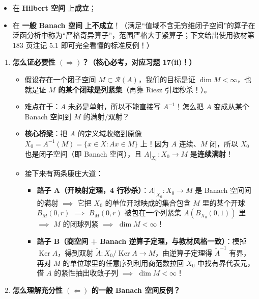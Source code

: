 \documentclass[11pt,a4paper]{article}
\providecommand{\tightlist}{\setlength{\itemsep}{2pt}\setlength{\parskip}{0pt}}
\newcommand{\SubPillAmber}[1]{%
  \Needspace{4.5\baselineskip}\vspace{5.5pt}\noindent
  \tcbox[on line, colback=AmberSoft, colframe=AmberMain!45!BorderColor, boxrule=0.45pt,
    arc=3.5pt, left=6pt, right=6pt, top=2pt, bottom=2pt]{\small\bfseries\color{AmberMain}#1}%
  \par\vspace{3pt}%
}
\renewenvironment{quote}{%
  \begin{tcolorbox}[
    enhanced,
    breakable,
    colback=AccentSoft!48!white,
    colframe=AccentMain,
    boxrule=0pt,
    leftrule=2.8pt,
    arc=2.5pt,
    left=9pt, right=8pt, top=6pt, bottom=6pt,
    before skip=5.5pt, after skip=5.5pt
  ]\small
}{%
  \end{tcolorbox}%
}
\begin{document}
\begin{quote}
\begin{enumerate}
\begin{itemize}
    \begin{itemize}
    \tightlist
    \item
      在 \textbf{Hilbert 空间} 上\textbf{成立}；
    \item
      在 \textbf{一般 Banach 空间} 上\textbf{不成立}！（满足``值域不含无穷维闭子空间''的算子在泛函分析中称为``严格奇异算子''，范围严格大于紧算子；下文给出使用教材第 183 页注记 5.1 即可完全看懂的标准反例！）
    \end{itemize}
  \end{itemize}
\end{enumerate}
\end{quote}

\SubPillAmber{【零基础破题思路】}

\begin{enumerate}
\def\labelenumi{\arabic{enumi}.}
\tightlist
\item
  \textbf{怎么证必要性 \((\Rightarrow)\)？（核心必考，对应习题 17(ii)！）}

  \begin{itemize}
  \tightlist
  \item
    假设存在一个\textbf{闭}子空间 \(M \subset \mathcal{R}(A)\)，我们的目标是证 \(\dim M < \infty\)，也就是证 \textbf{\(M\) 的某个闭球是列紧集}（再靠 Riesz 引理秒杀！）。
  \item
    难点在于：\(A\) 未必是单射，所以不能直接写 \(A^{-1}\)！怎么把 \(A\) 变成从某个 Banach 空间到 \(M\) 的满射/双射？
  \item
    \textbf{核心桥梁}：把 \(A\) 的定义域收缩到原像 \(X_0 = A^{-1}(M) = \{x \in X : Ax \in M\}\) 上！因为 \(A\) 连续、\(M\) 闭，所以 \(X_0\) 也是闭子空间（即 Banach 空间），且 \(A|_{X_0}: X_0 \to M\) 是\textbf{连续满射}！
  \item
    接下来有两条康庄大道：

    \begin{itemize}
    \tightlist
    \item
      \textbf{路子 A（开映射定理，4 行秒杀）}：\(A|_{X_0}: X_0 \to M\) 是 Banach 空间间的满射 \(\implies\) 它把 \(X_0\) 的单位开球映成的集合包含 \(M\) 里的某个开球 \(B_M(0, r)\) \(\implies\) \(B_M(0, r)\) 被包在一个列紧集 \(A(B_{X_0}(0, 1))\) 里 \(\implies\) \(M\) 的闭球列紧 \(\implies\) \(\dim M < \infty\)！
    \item
      \textbf{路子 B（商空间 + Banach 逆算子定理，与教材风格一致）}：模掉 \(\operatorname{Ker} A\)，得到双射 \(\tilde{A}: X_0 / \operatorname{Ker} A \to M\)，由逆算子定理得 \(\tilde{A}^{-1}\) 有界，再对 \(M\) 的单位球里的任意序列利用商范数拉回 \(X_0\) 中找有界代表元，借 \(A\) 的紧性抽出收敛子列 \(\implies\) \(\dim M < \infty\)！
    \end{itemize}
  \end{itemize}
\item
  \textbf{怎么理解充分性 \((\Leftarrow)\) 的一般 Banach 空间反例？}


\end{enumerate}
\end{document}
